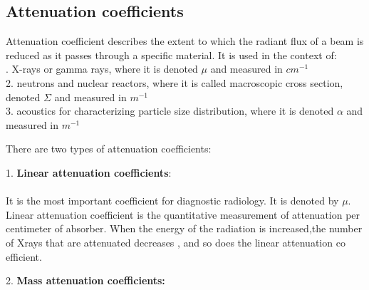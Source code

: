 \documentclass[12pt,a4paper]{article}%
\begin{document}
\begin{flushleft}
		
		\subsection{Attenuation coefficients} 
		\begin{flushleft}
		Attenuation coefficient describes the extent to which the radiant flux of a beam is reduced as it passes through a specific material. It is used in the context of:\\. X-rays or gamma rays, where it is denoted $\mu$ and measured in $cm^{-1}$\\
		2. neutrons and nuclear reactors, where it is called macroscopic cross section, denoted $\Sigma$ and measured in $m^{-1}$ \\
		3. acoustics for characterizing particle size distribution, where it is denoted $\alpha$ and measured in $m^{-1}$\\\bigskip
		\end{flushleft}
		There are  two types of attenuation coefficients:\\\bigskip
		
		1. \textbf{Linear attenuation coefficients}:
		\paragraph{}
		It is the most important coefficient for diagnostic radiology. It is denoted by $\mu$. Linear attenuation coefficient is the quantitative measurement of attenuation per
		centimeter of absorber. When the energy of the radiation is increased,the number of Xrays
		that are attenuated decreases , and so does the linear attenuation
		co efficient.\\\bigskip 
		
		2. \textbf{Mass attenuation coefficients:} 

\end{flushleft}
\end{document}
